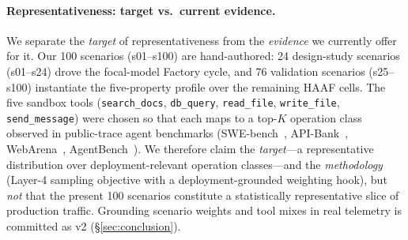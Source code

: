 \paragraph{Representativeness: target vs.\ current evidence.}
We separate the \emph{target} of representativeness from the \emph{evidence} we currently offer for it. Our 100 scenarios (s01--s100) are hand-authored: 24 design-study scenarios (s01--s24) drove the focal-model Factory cycle, and 76 validation scenarios (s25--s100) instantiate the five-property profile over the remaining HAAF cells. The five sandbox tools (\texttt{search\_docs}, \texttt{db\_query}, \texttt{read\_file}, \texttt{write\_file}, \texttt{send\_message}) were chosen so that each maps to a top-$K$ operation class observed in public-trace agent benchmarks (SWE-bench~\cite{jimenez2023swebench}, API-Bank~\cite{li2023apibank}, WebArena~\cite{zhou2023webarena}, AgentBench~\cite{liu2023agentbench}). We therefore claim the \emph{target}---a representative distribution over deployment-relevant operation classes---and the \emph{methodology} (Layer-4 sampling objective with a deployment-grounded weighting hook), but \emph{not} that the present 100 scenarios constitute a statistically representative slice of production traffic. Grounding scenario weights and tool mixes in real telemetry is committed as v2 (\S\ref{sec:conclusion}).

